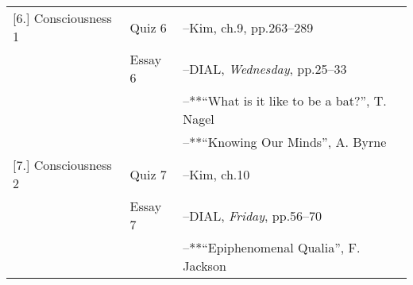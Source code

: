 \documentclass[article,oneside]{memoir}
\begin{document}
\begin{center}
\begin{longtable}{p{4.5cm}p{2cm}p{6cm}}
[6.] Consciousness 1			& Quiz 6		& --Kim, ch.9, pp.263--289 \\
					      	& Essay 6		& --DIAL, \emph{Wednesday}, pp.25--33 \\
						& 			& --**``What is it like to be a bat?'', T. Nagel \\ 
						&			& --**``Knowing Our Minds'', A. Byrne \\ [1.8\baselineskip]
 
[7.] Consciousness	2		& Quiz 7		& --Kim, ch.10 \\ 
					      	& Essay 7		& --DIAL, \emph{Friday}, pp.56--70 \\ 
					      	&			& --**``Epiphenomenal Qualia'', F. Jackson \\ [1.8\baselineskip]
\end{longtable}
\end{center}
\end{document}
